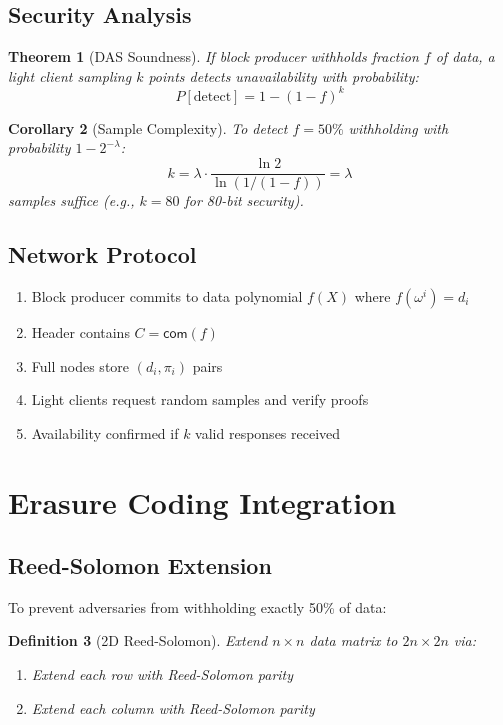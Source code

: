 \documentclass[11pt,a4paper]{article}
\newtheorem{theorem}{Theorem}[section]
\newtheorem{definition}[theorem]{Definition}
\newtheorem{corollary}[theorem]{Corollary}
\newcommand{\com}{\mathsf{com}}
\begin{document}
\subsection{Security Analysis}

\begin{theorem}[DAS Soundness]
If block producer withholds fraction $f$ of data, a light client sampling $k$ points detects unavailability with probability:
\[
P[\text{detect}] = 1 - (1-f)^k
\]
\end{theorem}

\begin{corollary}[Sample Complexity]
To detect $f = 50\%$ withholding with probability $1 - 2^{-\lambda}$:
\[
k = \lambda \cdot \frac{\ln 2}{\ln(1/(1-f))} = \lambda
\]
samples suffice (e.g., $k = 80$ for 80-bit security).
\end{corollary}

\subsection{Network Protocol}

\begin{enumerate}[label=(\roman*)]
    \item Block producer commits to data polynomial $f(X)$ where $f(\omega^i) = d_i$
    \item Header contains $C = \com(f)$
    \item Full nodes store $(d_i, \pi_i)$ pairs
    \item Light clients request random samples and verify proofs
    \item Availability confirmed if $k$ valid responses received
\end{enumerate}

\section{Erasure Coding Integration}
\label{sec:erasure}

\subsection{Reed-Solomon Extension}

To prevent adversaries from withholding exactly 50\% of data:

\begin{definition}[2D Reed-Solomon]
Extend $n \times n$ data matrix to $2n \times 2n$ via:
\begin{enumerate}[label=(\roman*)]
    \item Extend each row with Reed-Solomon parity
    \item Extend each column with Reed-Solomon parity
\end{enumerate}
\end{definition}
\end{document}
